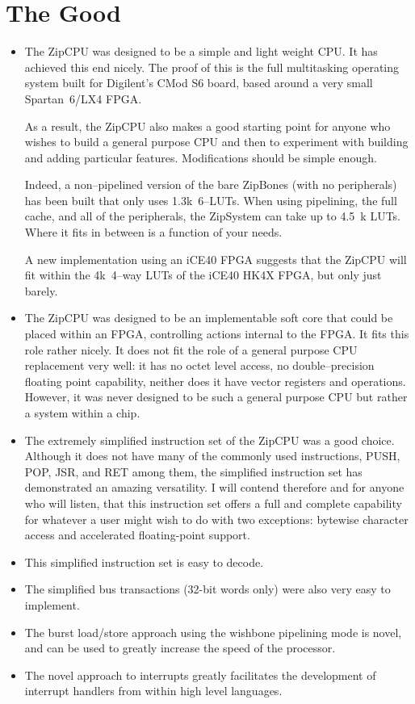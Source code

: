 \documentclass{gqtekspec}
\begin{document}
\section{The Good}
\begin{itemize}
\item The ZipCPU was designed to be a simple and light weight CPU.  It has
	achieved this end nicely.  The proof of this is the full multitasking
	operating system built for Digilent's CMod S6 board, based around
	a very small Spartan~6/LX4 FPGA. 

	As a result, the ZipCPU also makes a good starting point for anyone
	who wishes to build a general purpose CPU and then to experiment with
	building and adding particular features.  Modifications should be
	simple enough. 

	Indeed, a non--pipelined version of the bare ZipBones (with no
	peripherals) has been built that only uses 1.3k~6--LUTs.  When using
	pipelining, the full cache, and all of the peripherals, the ZipSystem
	can take up to 4.5~k LUTs.  Where it fits in between is a function of
	your needs.

	A new implementation using an iCE40 FPGA suggests that the ZipCPU
	will fit within the 4k~4--way LUTs of the iCE40 HK4X FPGA, but only
	just barely.

\item The ZipCPU was designed to be an implementable soft core that could be
	placed within an FPGA, controlling actions internal to the FPGA. It
	fits this role rather nicely. It does not fit the role of a general
	purpose CPU replacement very well: it has no octet level access,
	no double--precision floating point capability, neither does it have
	vector registers and operations.  However, it was never designed to be
	such a general purpose CPU but rather a system within a chip.  

\item The extremely simplified instruction set of the ZipCPU was a good
	choice. Although it does not have many of the commonly used
	instructions, PUSH, POP, JSR, and RET among them, the simplified
	instruction set has demonstrated an amazing versatility. I will contend
	therefore and for anyone who will listen, that this instruction set
	offers a full and complete capability for whatever a user might wish
	to do with two exceptions: bytewise character access and accelerated
	floating-point support.
\item This simplified instruction set is easy to decode.
\item The simplified bus transactions (32-bit words only) were also very easy
	to implement.
\item The burst load/store approach using the wishbone pipelining mode is
	novel, and can be used to greatly increase the speed of the processor.
\item The novel approach to interrupts greatly facilitates the development of
	interrupt handlers from within high level languages.


\end{itemize}
\end{document}
